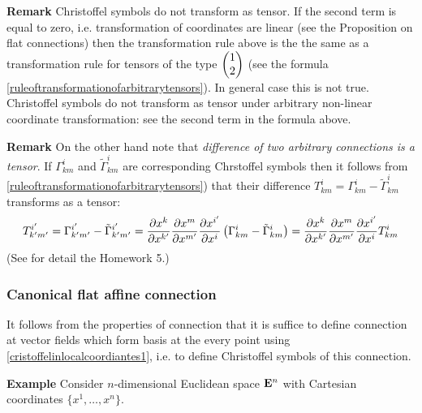 \documentclass[12pt]{article}
\theoremstyle{theorem}
\numberwithin{equation}{section}
\begin{document}
{\bf Remark}  Christoffel symbols do not transform as tensor.
If the second term is equal to zero, i.e. transformation of coordinates are linear
(see the Proposition on flat connections)  then the transformation rule above is the the same as a
transformation rule for tensors of the type $\begin{pmatrix} 1\cr 2\cr\end{pmatrix}$
(see the formula \eqref{ruleoftransformationofarbitrarytensors}).
 In general case this is not true. Christoffel symbols do not transform as tensor
 under arbitrary non-linear coordinate transformation: see the second term in the formula above.



{\footnotesize
{\bf Remark} On the other hand note that {\it difference of two arbitrary connections is a tensor}.
If $\Gamma^{i}_{km}$ and $\tilde \Gamma^i_{km}$ are corresponding Chrstoffel symbols then it follows
from \eqref{ruleoftransformationofarbitrarytensors}) that their difference
$T^i_{km}=\Gamma^{i}_{km}-\tilde\Gamma^{i}_{km}$ transforms as a tensor:
                        \begin{equation*}
T^{i'}_{k'm'}=\Gamma^{i'}_{k'm'}-\tilde\Gamma^{i'}_{k'm'}=
{\partial x^k\over \partial x^{k'}}
          {\partial x^m\over \partial x^{m'}}
          {\partial x^{i'}\over \partial x^i}
          \left(
          \Gamma_{km}^i-\tilde\Gamma_{km}^i\right)=
             {\partial x^k\over \partial x^{k'}}
          {\partial x^m\over \partial x^{m'}}
          {\partial x^{i'}\over \partial x^i}T^i_{km}
                                  \end{equation*}
                        (See for detail the Homework 5.)

}



\subsubsection {Canonical flat affine connection }\label{canonicalflatconnection}

  It follows from the properties of connection that it is suffice
   to define connection at vector fields which form basis at the every point
   using \eqref{cristoffelinlocalcoordiantes1}, i.e. to define Christoffel symbols of this connection.

   {\bf Example} Consider $n$-dimensional Euclidean space ${\bf E}^n$ with Cartesian coordinates
   $\{x^1,\dots,x^n\}$.
\end{document}
